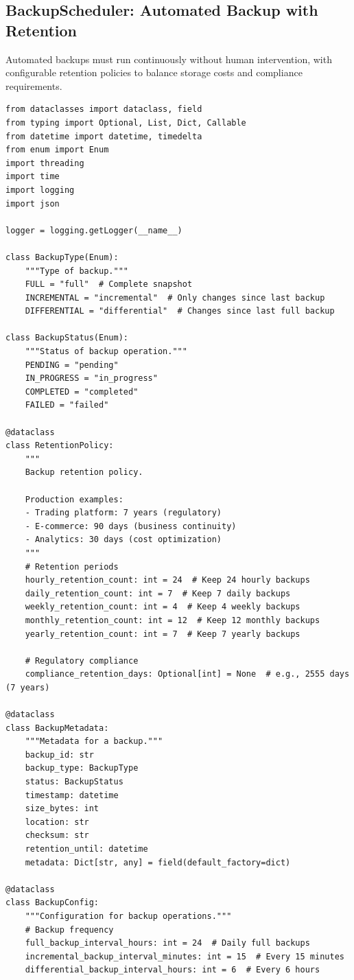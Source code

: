 \subsection{BackupScheduler: Automated Backup with Retention}

Automated backups must run continuously without human intervention, with configurable retention policies to balance storage costs and compliance requirements.

\begin{lstlisting}[style=python, caption={Backup Scheduler with Retention Policies}]
from dataclasses import dataclass, field
from typing import Optional, List, Dict, Callable
from datetime import datetime, timedelta
from enum import Enum
import threading
import time
import logging
import json

logger = logging.getLogger(__name__)

class BackupType(Enum):
    """Type of backup."""
    FULL = "full"  # Complete snapshot
    INCREMENTAL = "incremental"  # Only changes since last backup
    DIFFERENTIAL = "differential"  # Changes since last full backup

class BackupStatus(Enum):
    """Status of backup operation."""
    PENDING = "pending"
    IN_PROGRESS = "in_progress"
    COMPLETED = "completed"
    FAILED = "failed"

@dataclass
class RetentionPolicy:
    """
    Backup retention policy.

    Production examples:
    - Trading platform: 7 years (regulatory)
    - E-commerce: 90 days (business continuity)
    - Analytics: 30 days (cost optimization)
    """
    # Retention periods
    hourly_retention_count: int = 24  # Keep 24 hourly backups
    daily_retention_count: int = 7  # Keep 7 daily backups
    weekly_retention_count: int = 4  # Keep 4 weekly backups
    monthly_retention_count: int = 12  # Keep 12 monthly backups
    yearly_retention_count: int = 7  # Keep 7 yearly backups

    # Regulatory compliance
    compliance_retention_days: Optional[int] = None  # e.g., 2555 days (7 years)

@dataclass
class BackupMetadata:
    """Metadata for a backup."""
    backup_id: str
    backup_type: BackupType
    status: BackupStatus
    timestamp: datetime
    size_bytes: int
    location: str
    checksum: str
    retention_until: datetime
    metadata: Dict[str, any] = field(default_factory=dict)

@dataclass
class BackupConfig:
    """Configuration for backup operations."""
    # Backup frequency
    full_backup_interval_hours: int = 24  # Daily full backups
    incremental_backup_interval_minutes: int = 15  # Every 15 minutes
    differential_backup_interval_hours: int = 6  # Every 6 hours


\end{lstlisting}
